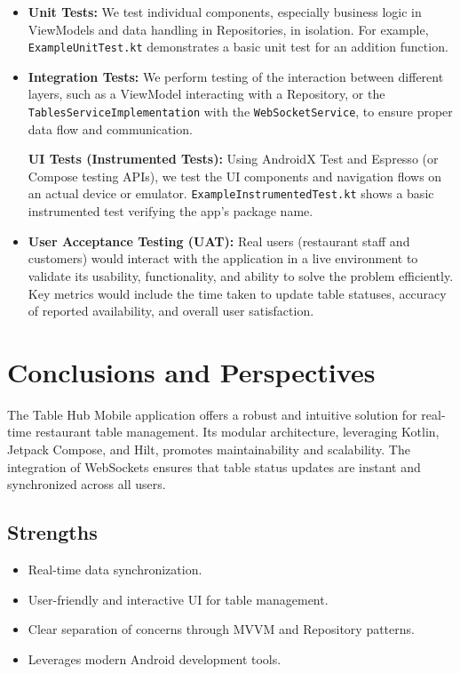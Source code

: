 \documentclass{article}
\begin{document}
\begin{itemize}
    \item \textbf{Unit Tests:} We test individual components, especially business logic in ViewModels and data handling in Repositories, in isolation. For example, \texttt{ExampleUnitTest.kt} demonstrates a basic unit test for an addition function.

    \item \textbf{Integration Tests:} We perform testing of the interaction between different layers, such as a ViewModel interacting with a Repository, or the \texttt{TablesServiceImplementation} with the \texttt{WebSocketService}, to ensure proper data flow and communication.

    \textbf{UI Tests (Instrumented Tests):} Using AndroidX Test and Espresso (or Compose testing APIs), we test the UI components and navigation flows on an actual device or emulator. \texttt{ExampleInstrumentedTest.kt} shows a basic instrumented test verifying the app's package name.

    \item \textbf{User Acceptance Testing (UAT):} Real users (restaurant staff and customers) would interact with the application in a live environment to validate its usability, functionality, and ability to solve the problem efficiently. Key metrics would include the time taken to update table statuses, accuracy of reported availability, and overall user satisfaction.
\end{itemize}

\section{Conclusions and Perspectives}
The Table Hub Mobile application offers a robust and intuitive solution for real-time restaurant table management. Its modular architecture, leveraging Kotlin, Jetpack Compose, and Hilt, promotes maintainability and scalability. The integration of WebSockets ensures that table status updates are instant and synchronized across all users.

\subsection{Strengths}
\begin{itemize}
    \item Real-time data synchronization.
    \item User-friendly and interactive UI for table management.
    \item Clear separation of concerns through MVVM and Repository patterns.
    \item Leverages modern Android development tools.
\end{itemize}
\end{document}
